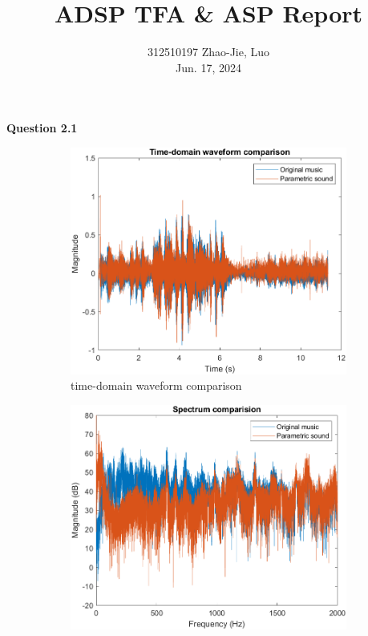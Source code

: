 \documentclass[journal,12pt,onecolumn,draftclsnofoot]{IEEEtran}
\begin{document}
    \title{ ADSP TFA \& ASP Report }
    \author{312510197 Zhao-Jie, Luo\\
        \small{Jun. 17, 2024}}


    \maketitle


    \noindent \textbf{Question 2.1}
        \begin{figure}[H]
            \centering
            \begin{subfigure}[b]{0.45\linewidth}
                \includegraphics[width=\linewidth]{figures/time-domain waveform comparison.png}
                \caption{time-domain waveform comparison}
                \label{fig:time-domain waveform comparison}
            \end{subfigure}
            \begin{subfigure}[b]{0.45\linewidth}
                \includegraphics[width=\linewidth]{figures/spectrum comparison.png}

\end{subfigure}
\end{figure}
\end{document}
